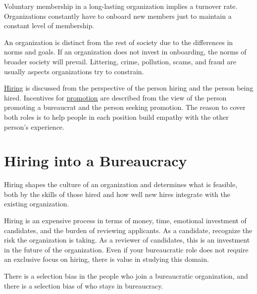 

Voluntary membership in a long-lasting organization implies a turnover rate. Organizations constantly have to onboard new members just to maintain a constant level of membership.

An organization is distinct from the rest of society due to the differences in norms and goals. If an organization does not invest in onboarding, the norms of broader society will prevail. Littering, crime, pollution, scams, and fraud are usually aspects organizations try to constrain.

\hyperref[sec:hiring]{Hiring}\iftoggle{haspagenumbers}{ (see page~\pageref{sec:hiring})}{}
is discussed from the perspective of the person hiring and the person being hired. 
Incentives for \hyperref[sec:promotion]{promotion}\iftoggle{haspagenumbers}{ (see page~\pageref{sec:promotion})}{}
are described from the view of the person promoting a bureaucrat and the person seeking promotion. 
The reason to cover both roles is to help people in each position build empathy with the other person's experience. 


\section{Hiring into a Bureaucracy\label{sec:hiring}}


Hiring shapes the culture of an organization and determines what is feasible, both by the skills of those hired and how well new hires integrate with the existing organization. 

Hiring is an expensive process in terms of money, time, emotional investment of candidates, and the burden of reviewing applicants. 
As a candidate, recognize the risk the organization is taking. 
As a reviewer of candidates, this is an investment in the future of the organization. Even if your bureaucratic role does not require an exclusive focus on hiring, there is value in studying this domain. 

There is a selection bias in the people who join a bureaucratic organization, and there is a selection bias of who stays in bureaucracy. 

